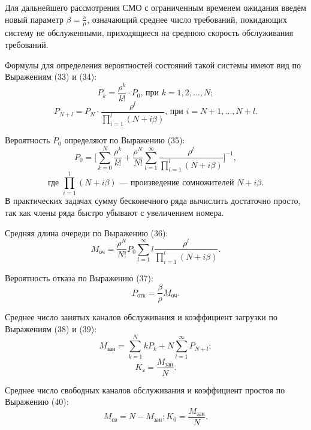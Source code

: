 \documentclass[14pt]{extarticle}
\begin{document}
    Для дальнейшего рассмотрения СМО с ограниченным временем ожидания введём новый параметр $\beta = \frac{\nu}{\mu}$, означающий среднее число требований, покидающих систему не обслуженными,  приходящиеся на среднюю скорость обслуживания требований.

    Формулы для определения вероятностей состояний такой системы имеют вид  по Выражениям (33) и (34):
    \begin{equation}
        P_k = \frac{\rho^k}{k!} \cdot P_0\text{, при }k = 1, 2,..., N;
    \end{equation}
    \begin{equation}
        P_{N + l} = P_N \cdot \frac{\rho^l}{\prod_{i = 1}^l (N + i \beta) } \text{, при }i = N + 1,...,N + l.
    \end{equation}

    Вероятность $P_0$ определяют по Выражению (35):
    \begin{equation}
        P_0 = \Bigg[ \sum_{k = 0}^N \frac{\rho^k}{k!} + \frac{\rho^N}{N!} \sum_{l = 1}^\infty \frac{\rho^l}{\prod_{i = 1}^l (N + i \beta)} \Bigg]^{-1},
    \end{equation}
    $$
    \text{где } \prod_{i = 1}^l ( N + i \beta) \text { --- произведение сомножителей } N + i \beta .
    $$
    В практических задачах сумму бесконечного ряда вычислить достаточно просто, так как члены ряда быстро убывают с увеличением номера.

    Средняя длина очереди по Выражению (36):
    \begin{equation}
        M_\text{оч} = \frac{\rho^N}{N!} P_0 \sum_{l = 1}^\infty l \frac{\rho^l}{\prod_{i = 1}^l (N + i \beta)}.
    \end{equation}

    Вероятность отказа по Выражению (37):
    \begin{equation}
        P_\text{отк} = \frac{\beta}{\rho} M_\text{оч}.
    \end{equation}

    Среднее число занятых каналов обслуживания и коэффициент загрузки по Выражениям (38) и (39):
    \begin{equation}
        M_\text{зан} = \sum_{k = 1}^N k P_k + N \sum_{l = 1}^\infty P_{N + l};
    \end{equation}
    \begin{equation}
        K_\text{з} = \frac{M_\text{зан}}{N}.
    \end{equation}

    Среднее число свободных каналов обслуживания и коэффициент простоя по Выражению (40):
    \begin{equation}
        M_\text{св} = N - M_\text{зан}; K_0 = \frac{M_\text{зан}}{N}.
    \end{equation}
\end{document}
